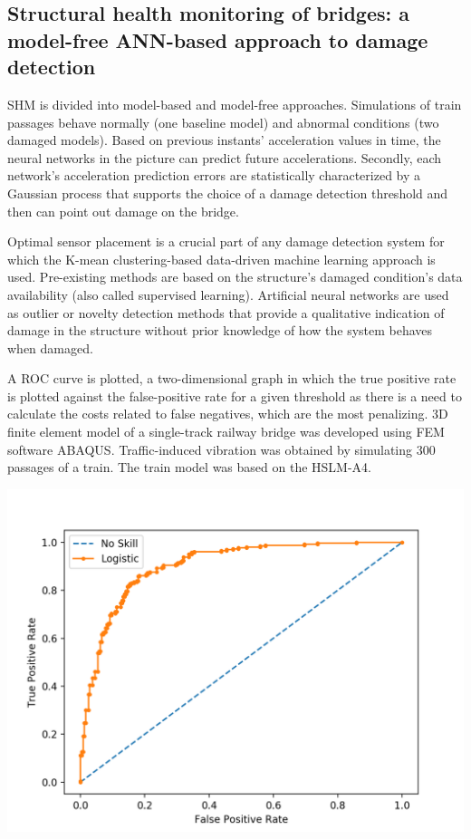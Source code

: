 \documentclass{article}
\begin{document}
\subsection{Structural health monitoring of bridges: a model-free ANN-based approach to damage detection}
SHM is divided into model-based and model-free approaches. Simulations of train passages behave normally (one baseline model) and abnormal conditions (two damaged models). Based on previous instants' acceleration values in time, the neural networks in the picture can predict future accelerations. Secondly, each network's acceleration prediction errors are statistically characterized by a Gaussian process that supports the choice of a damage detection threshold and then can point out damage on the bridge.

Optimal sensor placement is a crucial part of any damage detection system for which the K-mean clustering-based data-driven machine learning approach is used.  Pre-existing methods are based on the structure's damaged condition's data availability (also called supervised learning). Artificial neural networks are used as outlier or novelty detection methods that provide a qualitative indication of damage in the structure without prior knowledge of how the system behaves when damaged. 

A ROC curve is plotted, a two-dimensional graph in which the true positive rate is plotted against the false-positive rate for a given threshold as there is a need to calculate the costs related to false negatives, which are the most penalizing. 3D finite element model of a single-track railway bridge was developed using FEM software ABAQUS. Traffic-induced vibration was obtained by simulating 300 passages of a train. The train model was based on the HSLM-A4.

\begin{center}
    \includegraphics[scale=0.50]{Images/ROC.png}
    
\end{center}
\end{document}
